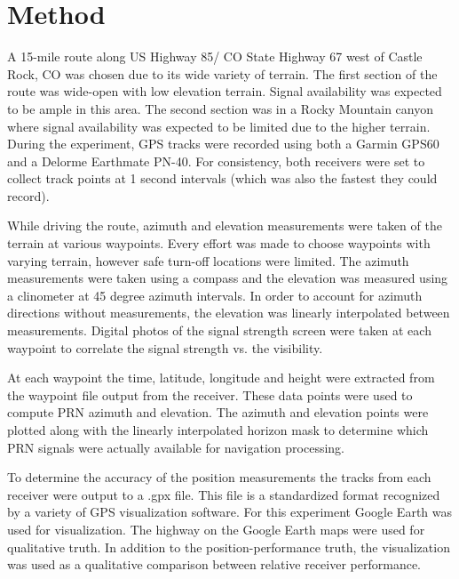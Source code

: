 \documentclass[]{aiaa-tc}%
\begin{document}
	\section{Method}
	
	\noindent A 15-mile route along US Highway 85/ CO State Highway 67 west of Castle Rock, CO was chosen due to its wide variety of terrain. The first section of the route was wide-open with low elevation terrain. Signal availability was expected to be ample in this area. The second section was in a Rocky Mountain canyon where signal availability was expected to be limited due to the higher terrain. During the experiment, GPS tracks were recorded using both a Garmin GPS60 and a Delorme Earthmate PN-40. For consistency, both receivers were set to collect track points at 1 second intervals (which was also the fastest they could record).
	
	\vspace{5 mm}
	
	\noindent While driving the route, azimuth and elevation measurements were taken of the terrain at various waypoints. Every effort was made to choose waypoints with varying terrain, however safe turn-off locations were limited. The azimuth measurements were taken using a compass and the elevation was measured using a clinometer at 45 degree azimuth intervals. In order to account for azimuth directions without measurements, the elevation was linearly interpolated between measurements. Digital photos of the signal strength screen were taken at each waypoint to correlate the signal strength vs. the visibility.
	
	\vspace{5 mm}
	
	\noindent At each waypoint the time, latitude, longitude and height were extracted from the waypoint file output from the receiver. These data points were used to compute PRN azimuth and elevation. The azimuth and elevation points were plotted along with the linearly interpolated horizon mask to determine which PRN signals were actually available for navigation processing. 
	
	\vspace{5 mm} 
	
	\noindent To determine the accuracy of the position measurements the tracks from each receiver were output to a .gpx file. This file is a standardized format recognized by a variety of GPS visualization software. For this experiment Google Earth was used for visualization. The highway on the Google Earth maps were used for qualitative truth. In addition to the position-performance truth, the visualization was used as a qualitative comparison between relative receiver performance. 
	
\end{document}
